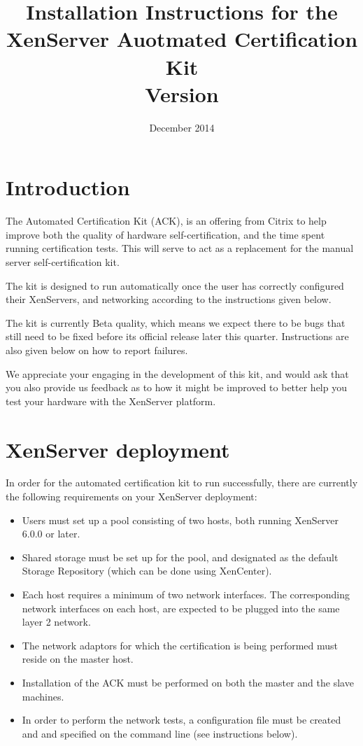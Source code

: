 \documentclass[a4paper,11pt]{article}
\title{Installation Instructions for the XenServer Auotmated Certification Kit\\\normalsize Version \versionnumber}
\date{December 2014}
\begin{document}
\maketitle

\section{Introduction}
The Automated Certification Kit (ACK), is an offering from Citrix to help improve both the quality of hardware self-certification, and the time spent running certification tests. This will serve to act as a replacement for the manual server self-certification kit.

The kit is designed to run automatically once the user has correctly configured their XenServers, and networking according to the instructions given below. 

The kit is currently Beta quality, which means we expect there to be bugs that still need to be fixed before its official release later this quarter. Instructions are also given below on how to report failures. 

We appreciate your engaging in the development of this kit, and would ask that you also provide us feedback as to how it might be improved to better help you test your hardware with the XenServer platform.

\section{XenServer deployment}
In order for the automated certification kit to run successfully, there are currently the following requirements on your XenServer deployment:
\begin{itemize}
\item Users must set up a pool consisting of two hosts, both running XenServer 6.0.0 or later.
\item Shared storage must be set up for the pool, and designated as the default Storage Repository (which can be done using XenCenter).
\item Each host requires a minimum of two network interfaces. The corresponding network interfaces on each host, are expected to be plugged into the same layer 2 network.
\item The network adaptors for which the certification is being performed must reside on the master host.
\item Installation of the ACK must be performed on both the master and the slave machines.
\item In order to perform the network tests, a configuration file must be created and and specified on the command line (see instructions below).
\end{itemize}
\end{document}
